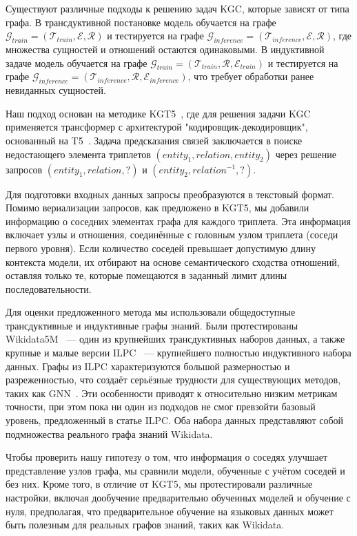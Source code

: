 Существуют различные подходы к решению задач KGC, которые зависят от типа графа. В трансдуктивной постановке модель обучается на графе \(\mathcal{G}_{train} = (\mathcal{T}_{train}, \mathcal{E}, \mathcal{R})\) и тестируется на графе \(\mathcal{G}_{inference} = (\mathcal{T}_{inference}, \mathcal{E}, \mathcal{R})\), где множества сущностей и отношений остаются одинаковыми. В индуктивной задаче модель обучается на графе \(\mathcal{G}_{train} = (\mathcal{T}_{train}, \mathcal{R}, \mathcal{E}_{train})\) и тестируется на графе \(\mathcal{G}_{inference} = (\mathcal{T}_{inference}, \mathcal{R}, \mathcal{E}_{inference})\), что требует обработки ранее невиданных сущностей.

Наш подход основан на методике KGT5~\cite{kgt5}, где для решения задачи KGC применяется трансформер с архитектурой "кодировщик-декодировщик", основанный на T5~\cite{raffel2020t5}. Задача предсказания связей заключается в поиске недостающего элемента триплетов \((entity_1, relation, entity_2)\) через решение запросов \((entity_1, relation, ?)\) и \((entity_2, relation^{-1}, ?)\).

Для подготовки входных данных запросы преобразуются в текстовый формат. Помимо вериализации запросов, как предложено в KGT5, мы добавили информацию о соседних элементах графа для каждого триплета. Эта информация включает узлы и отношения, соединённые с головным узлом триплета (соседи первого уровня). Если количество соседей превышает допустимую длину контекста модели, их отбирают на основе семантического сходства отношений, оставляя только те, которые помещаются в заданный лимит длины последовательности.

Для оценки предложенного метода мы использовали общедоступные трансдуктивные и индуктивные графы знаний. Были протестированы Wikidata5M~\cite{wang2021kepler} — один из крупнейших трансдуктивных наборов данных, а также крупные и малые версии ILPC~\cite{ilpc} — крупнейшего полностью индуктивного набора данных. Графы из ILPC характеризуются большой размерностью и разреженностью, что создаёт серьёзные трудности для существующих методов, таких как GNN~\cite{ilpc}. Эти особенности приводят к относительно низким метрикам точности, при этом пока ни один из подходов не смог превзойти базовый уровень, предложенный в статье ILPC. Оба набора данных представляют собой подмножества реального графа знаний Wikidata.

Чтобы проверить нашу гипотезу о том, что информация о соседях улучшает представление узлов графа, мы сравнили модели, обученные с учётом соседей и без них. Кроме того, в отличие от KGT5, мы протестировали различные настройки, включая дообучение предварительно обученных моделей и обучение с нуля, предполагая, что предварительное обучение на языковых данных может быть полезным для реальных графов знаний, таких как Wikidata.


